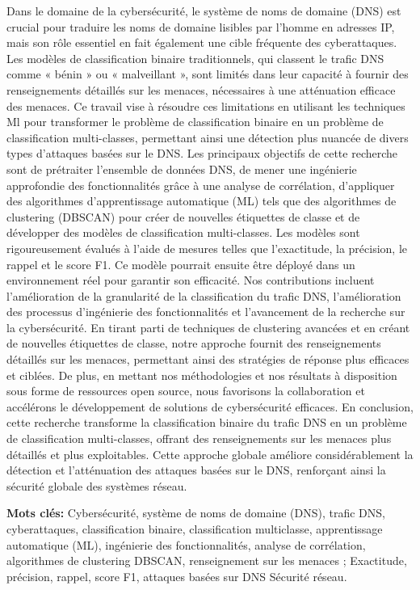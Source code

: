 \let\oldprintchaptertitle=\printchaptertitle
\renewcommand{\printchaptertitle}[1]{%
	\vspace*{-75pt}
	\oldprintchaptertitle{#1}
}%
\let\printchaptertitle=\oldprintchaptertitle
Dans le domaine de la cybersécurité, le système de noms de domaine (DNS) est crucial pour traduire les noms de domaine lisibles par l’homme en adresses IP, mais son rôle essentiel en fait également une cible fréquente des cyberattaques. Les modèles de classification binaire traditionnels, qui classent le trafic DNS comme « bénin » ou « malveillant », sont limités dans leur capacité à fournir des renseignements détaillés sur les menaces, nécessaires à une atténuation efficace des menaces. Ce travail vise à résoudre ces limitations en utilisant les techniques Ml pour transformer le problème de classification binaire en un problème de classification multi-classes, permettant ainsi une détection plus nuancée de divers types d'attaques basées sur le DNS.
Les principaux objectifs de cette recherche sont de prétraiter l'ensemble de données DNS, de mener une ingénierie approfondie des fonctionnalités grâce à une analyse de corrélation, d'appliquer des algorithmes d'apprentissage automatique (ML) tels que des algorithmes de clustering (DBSCAN) pour créer de nouvelles étiquettes de classe et de développer des modèles de classification multi-classes. Les modèles sont rigoureusement évalués à l’aide de mesures telles que l’exactitude, la précision, le rappel et le score F1. Ce modèle pourrait ensuite être déployé dans un environnement réel pour garantir son efficacité.
Nos contributions incluent l’amélioration de la granularité de la classification du trafic DNS, l’amélioration des processus d’ingénierie des fonctionnalités et l’avancement de la recherche sur la cybersécurité. En tirant parti de techniques de clustering avancées et en créant de nouvelles étiquettes de classe, notre approche fournit des renseignements détaillés sur les menaces, permettant ainsi des stratégies de réponse plus efficaces et ciblées. De plus, en mettant nos méthodologies et nos résultats à disposition sous forme de ressources open source, nous favorisons la collaboration et accélérons le développement de solutions de cybersécurité efficaces.
En conclusion, cette recherche transforme la classification binaire du trafic DNS en un problème de classification multi-classes, offrant des renseignements sur les menaces plus détaillés et plus exploitables. Cette approche globale améliore considérablement la détection et l'atténuation des attaques basées sur le DNS, renforçant ainsi la sécurité globale des systèmes réseau.

\vspace{1cm}
\noindent\textbf{Mots clés:} Cybersécurité, système de noms de domaine (DNS), trafic DNS, cyberattaques, classification binaire, classification multiclasse, apprentissage automatique (ML), ingénierie des fonctionnalités, analyse de corrélation, algorithmes de clustering DBSCAN, renseignement sur les menaces ; Exactitude, précision, rappel, score F1, attaques basées sur DNS Sécurité réseau.

\myCleanStarChapterEnd
